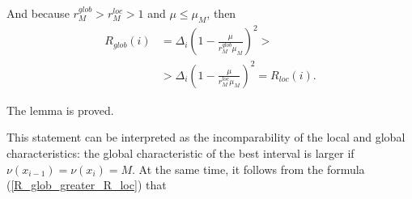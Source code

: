 \documentclass[twocolumn]{svjour3}          %
\begin{document}
And because $r_{M}^{glob} > r_{M}^{loc} > 1$ and $\mu \leq \mu_M$, then
\begin{align}\label{R_glob_greater_R_loc}
	R_{glob}(i) &= \Delta_i\left(1-\frac{\mu}{r_M^{glob}\mu_M} \right)^2 > \nonumber \\
							&> \Delta_i\left(1-\frac{\mu}{r_M^{loc}\mu_M} \right)^2 = R_{loc}(i).
\end{align}

	

The lemma is proved.



	This statement can be interpreted as the incomparability of the local and global characteristics: the global characteristic of the best interval is larger if $\nu(x_{i-1})=\nu(x_i)=M$. At the same time, it follows from the formula (\ref{R_glob_greater_R_loc}) that 
	
\end{document}
